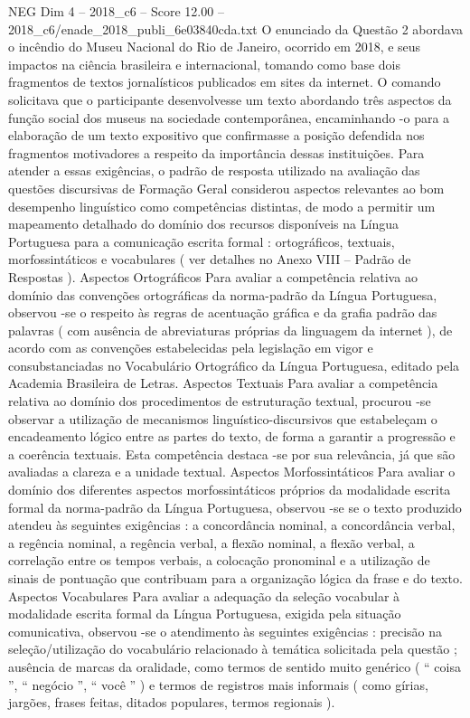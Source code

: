 \begin{textsample}{NEG Dim 4 – 2018\_c6 – Score 12.00 – 2018\_c6/enade\_2018\_publi\_6e03840cda.txt}
O enunciado da Questão 2 abordava o incêndio do Museu Nacional do Rio de Janeiro, ocorrido em 2018, e seus impactos na ciência brasileira e internacional, tomando como base dois fragmentos de textos jornalísticos publicados em sites da internet.
O comando solicitava que o participante desenvolvesse um texto abordando três aspectos da função social dos museus na sociedade contemporânea, encaminhando -o para a elaboração de um texto expositivo que confirmasse a posição defendida nos fragmentos motivadores a respeito da importância dessas instituições.
Para atender a essas exigências, o padrão de resposta utilizado na avaliação das questões discursivas de Formação Geral considerou aspectos relevantes ao bom desempenho linguístico como competências distintas, de modo a permitir um mapeamento detalhado do domínio dos recursos disponíveis na Língua Portuguesa para a comunicação escrita formal : ortográficos, textuais, morfossintáticos e vocabulares ( ver detalhes no Anexo VIII – Padrão de Respostas ).
Aspectos Ortográficos Para avaliar a competência relativa ao domínio das convenções ortográficas da norma-padrão da Língua Portuguesa, observou -se o respeito às regras de acentuação gráfica e da grafia padrão das palavras ( com ausência de abreviaturas próprias da linguagem da internet ), de acordo com as convenções estabelecidas pela legislação em vigor e consubstanciadas no Vocabulário Ortográfico da Língua Portuguesa, editado pela Academia Brasileira de Letras.
Aspectos Textuais Para avaliar a competência relativa ao domínio dos procedimentos de estruturação textual, procurou -se observar a utilização de mecanismos linguístico-discursivos que estabeleçam o encadeamento lógico entre as partes do texto, de forma a garantir a progressão e a coerência textuais.
Esta competência destaca -se por sua relevância, já que são avaliadas a clareza e a unidade textual.
Aspectos Morfossintáticos Para avaliar o domínio dos diferentes aspectos morfossintáticos próprios da modalidade escrita formal da norma-padrão da Língua Portuguesa, observou -se se o texto produzido atendeu às seguintes exigências : a concordância nominal, a concordância verbal, a regência nominal, a regência verbal, a flexão nominal, a flexão verbal, a correlação entre os tempos verbais, a colocação pronominal e a utilização de sinais de pontuação que contribuam para a organização lógica da frase e do texto.
Aspectos Vocabulares Para avaliar a adequação da seleção vocabular à modalidade escrita formal da Língua Portuguesa, exigida pela situação comunicativa, observou -se o atendimento às seguintes exigências : precisão na seleção/utilização do vocabulário relacionado à temática solicitada pela questão ; ausência de marcas da oralidade, como termos de sentido muito genérico ( “ coisa ”, “ negócio ”, “ você ” ) e termos de registros mais informais ( como gírias, jargões, frases feitas, ditados populares, termos regionais ).

\end{textsample}
